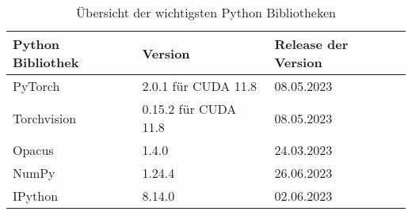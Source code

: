 \begin{table}[!htb]
\centering
\begin{tabular}{|l|l|l|}
\hline
\rowcolor[HTML]{CBCEFB} 
{\color[HTML]{000000} Python Bibliothek} & {\color[HTML]{000000} Version} & Release der Version \\ \hline
PyTorch                                  & 2.0.1 für CUDA 11.8            & 08.05.2023          \\ \hline
Torchvision                              & 0.15.2 für CUDA 11.8           & 08.05.2023          \\ \hline
Opacus                                   & 1.4.0                          & 24.03.2023          \\ \hline
NumPy                                    & 1.24.4                         & 26.06.2023          \\ \hline
IPython                                  & 8.14.0                         & 02.06.2023          \\ \hline
\end{tabular}
\caption{Übersicht der wichtigsten Python Bibliotheken}
\label{tab:python_libs}
\end{table}